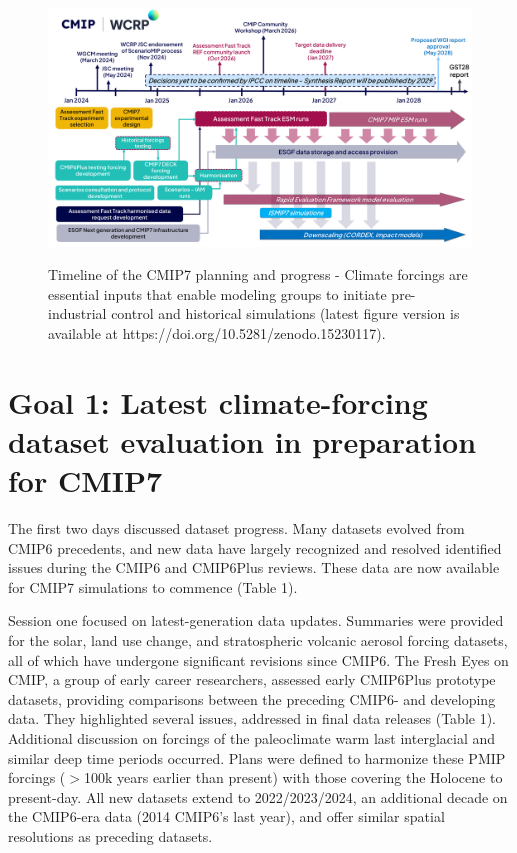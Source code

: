 \documentclass{ametsocV6.1}
\begin{document}
\begin{figure}[t]
	 \noindent\includegraphics[width=\textwidth,angle=0]{250515_Fig1.pdf}\\
	 \caption{Timeline of the CMIP7 planning and progress - Climate forcings are essential inputs that enable modeling groups to initiate pre-industrial control and historical simulations (latest figure version is available at https://doi.org/10.5281/zenodo.15230117).}
	 \label{fig:f1}
\end{figure}


\section*{Goal 1: Latest climate-forcing dataset evaluation in preparation for CMIP7}
The first two days discussed dataset progress. Many datasets evolved from CMIP6 precedents, and new data have largely recognized and resolved identified issues during the CMIP6 and CMIP6Plus reviews. These data are now available for CMIP7 simulations to commence (Table 1).

Session one focused on latest-generation data updates. Summaries were provided for the solar, land use change, and stratospheric volcanic aerosol forcing datasets, all of which have undergone significant revisions since CMIP6. The Fresh Eyes on CMIP, a group of early career researchers, assessed early CMIP6Plus prototype datasets, providing comparisons between the preceding CMIP6- and developing data. They highlighted several issues, addressed in final data releases (Table 1). Additional discussion on forcings of the paleoclimate warm last interglacial and similar deep time periods occurred. Plans were defined to harmonize these PMIP forcings ($>$100k years earlier than present) with those covering the Holocene to present-day. All new datasets extend to 2022/2023/2024, an additional decade on the CMIP6-era data (2014 CMIP6’s last year), and offer similar spatial resolutions as preceding datasets.
\end{document}

